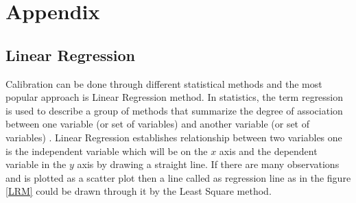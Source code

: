 \chapter{Appendix}



\section{Linear Regression}



Calibration can be done through different statistical methods and the most popular approach is Linear Regression method. In statistics, the term regression is used to describe a group of methods that summarize the degree of association between one variable (or set of variables) and another variable (or set of variables) \cite{Burke}. Linear Regression establishes relationship between two variables one is the independent variable which will be on the $x$ axis and the dependent variable in the $y$ axis by drawing a straight line. If there are many observations and is plotted as a scatter plot then a line called as regression line as in the figure \ref{LRM} could be drawn through it by the Least Square method. 


